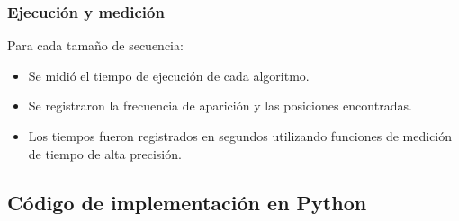 \documentclass[fleqn,10pt]{article}
\begin{document}
\subsubsection{Ejecución y medición}
Para cada tamaño de secuencia:
\begin{itemize}
    \item Se midió el tiempo de ejecución de cada algoritmo.
    \item Se registraron la frecuencia de aparición y las posiciones encontradas.
    \item Los tiempos fueron registrados en segundos utilizando funciones de medición de tiempo de alta precisión.
\end{itemize}

\subsection{Código de implementación en Python}
\end{document}
